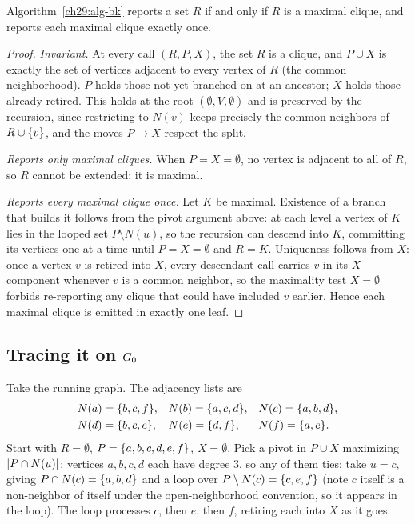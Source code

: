\begin{lemma}
\label{ch29:lem-bk-correct}
Algorithm~\ref{ch29:alg-bk} reports a set $R$ if and only if $R$ is a maximal
clique, and reports each maximal clique exactly once.
\end{lemma}

\begin{proof}
\emph{Invariant.} At every call $(R,P,X)$, the set $R$ is a clique, and
$P\cup X$ is exactly the set of vertices adjacent to every vertex of $R$ (the
common neighborhood). $P$ holds those not yet branched on at an ancestor; $X$
holds those already retired. This holds at the root $(\emptyset,V,\emptyset)$ and
is preserved by the recursion, since restricting to $N(v)$ keeps precisely the
common neighbors of $R\cup\{v\}$, and the moves $P\to X$ respect the split.

\emph{Reports only maximal cliques.} When $P=X=\emptyset$, no vertex is adjacent
to all of $R$, so $R$ cannot be extended: it is maximal.

\emph{Reports every maximal clique once.} Let $K$ be maximal. Existence of a
branch that builds it follows from the pivot argument above: at each level a
vertex of $K$ lies in the looped set $P\setminus N(u)$, so the recursion can
descend into $K$, committing its vertices one at a time until $P=X=\emptyset$ and
$R=K$. Uniqueness follows from $X$: once a vertex $v$ is retired into $X$, every
descendant call carries $v$ in its $X$ component whenever $v$ is a common
neighbor, so the maximality test $X=\emptyset$ forbids re-reporting any clique
that could have included $v$ earlier. Hence each maximal clique is emitted in
exactly one leaf.
\end{proof}

\subsection{Tracing it on $G_0$}
\label{ch29:bk-trace}

Take the running graph. The adjacency lists are
\[
\begin{aligned}
&N(a)=\{b,c,f\}, &&N(b)=\{a,c,d\}, &&N(c)=\{a,b,d\},\\
&N(d)=\{b,c,e\}, &&N(e)=\{d,f\},   &&N(f)=\{a,e\}.
\end{aligned}
\]
Start with $R=\emptyset$, $P=\{a,b,c,d,e,f\}$, $X=\emptyset$. Pick a pivot in
$P\cup X$ maximizing $\lvert P\cap N(u)\rvert$: vertices $a,b,c,d$ each have degree $3$,
so any of them ties; take $u=c$, giving $P\cap N(c)=\{a,b,d\}$ and a loop over
$P\setminus N(c)=\{c,e,f\}$ (note $c$ itself is a non-neighbor of itself under
the open-neighborhood convention, so it appears in the loop). The loop processes
$c$, then $e$, then $f$, retiring each into $X$ as it goes.

